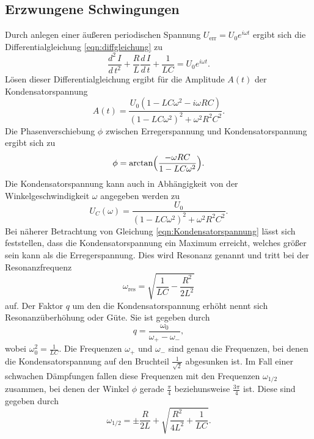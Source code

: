     \subsection{Erzwungene Schwingungen}        
        Durch anlegen einer äußeren periodischen Spannung $U_\text{err} = U_0 e^{i \omega t }$ ergibt sich die Differentialgleichung \eqref{eqn:diffgleichung}
        zu
        \begin{equation}
            \label{eqn:diffgleichung2}
            \frac{d^2 \, I}{d \, t^2} + \frac{R}{L} \frac{d \, I}{d \, t} + \frac {1}{L C} = U_0 e^{i \omega t}.
        \end{equation}    
        Lösen dieser Differentialgleichung ergibt für die Amplitude $A(t)$ der Kondensatorspannung
        \begin{equation}
            \label{eqn:amplitude}
            A(t) = \frac{U_0 (1 - L C \omega^2 - i \omega R C)}{(1 - L C \omega^2)^2 + \omega^2 R^2 C^2}.
        \end{equation}
        Die Phasenverschiebung $\phi$ zwischen Erregerspannung und Kondensatorspannung ergibt sich zu
        \begin{equation}
            \label{eqn:phasenverschiebung}
            \phi = \arctan \Bigl( \frac {- \omega R C} {1 - L C \omega^2} \Bigr).
        \end{equation}
        Die Kondensatorspannung kann auch in Abhängigkeit von der Winkelgeschwindigkeit $\omega$ angegeben werden zu
        \begin{equation}
            \label{eqn:Kondensatorspannung}
            U_C(\omega) = \frac {U_0} {(1 - L C \omega^2)^2 + \omega^2 R^2 C^2}.
        \end{equation}
        Bei näherer Betrachtung von Gleichung \eqref{eqn:Kondensatorspannung} lässt sich feststellen, dass die Kondensatorspannung
        ein Maximum erreicht, welches größer sein kann als die Erregerspannung. Dies wird Resonanz genannt und tritt bei der Resonanzfrequenz
        \begin{equation}
            \label{eqn:Resonanzfrequenz}
            \omega_\text{res} = \sqrt{\frac{1}{L C} - \frac{R^2}{2 L^2}}
        \end{equation}
        auf. Der Faktor $q$ um den die Kondensatorspannung erhöht nennt sich Resonanzüberhöhung oder Güte. 
        Sie ist gegeben durch 
        \begin{equation} %
            \label{eqn:güte}
            q = \frac {\omega_0} {\omega_+ - \omega_-},
        \end{equation}
        wobei $\omega_0^2 = \frac{1}{L C}$.   
        Die Frequenzen $\omega_+$ und $\omega_-$ sind genau die Frequenzen, bei denen die Kondensatorspannung auf den Bruchteil $\frac{1}{\sqrt{2}}$
        abgesunken ist. Im Fall einer schwachen Dämpfungen fallen diese Frequenzen mit den Frequenzen $\omega_\text{$1/2$}$ zusammen, bei denen
        der Winkel $\phi$ gerade $\frac{\pi}{4}$ beziehunsweise $\frac{3 \pi}{4}$ ist.
        Diese sind gegeben durch
        \begin{equation}
            \label{eqn:omega12}
            \omega_\text{$1/2$} = \pm \frac{R}{2 L} + \sqrt{\frac{R^2}{4 L^2} + \frac{1}{L C} }.
        \end{equation}    